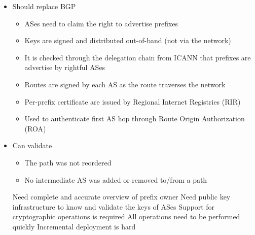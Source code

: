 \begin{itemize}
\begin{itemize}
\begin{itemize}
                    \item Should replace BGP
                        \begin{itemize}
                            \item ASes need to claim the right to advertise prefixes
                            \item Keys are signed and distributed out-of-band (not via the network)
                            \item It is checked through the delegation chain from ICANN that prefixes are advertise by rightful ASes
                        \end{itemize}
                        \begin{itemize}
                            \item Routes are signed by each AS as the route traverses the network
                        \end{itemize}
                        \begin{itemize}
                            \item Per-prefix certificate are issued by Regional Internet Registries (RIR)
                            \item Used to authenticate first AS hop through Route Origin Authorization (ROA)
                        \end{itemize}
                    \item Can validate
                        \begin{itemize}
                            \item The path was not reordered
                            \item No intermediate AS was added or removed to/from a path
                        \end{itemize}
                        \begin{itemize}
                            \icon Need complete and accurate overview of prefix owner
                            \icon Need public key infrastructure to know and validate the keys of ASes
                            \icon Support for cryptographic operations is required
                            \icon All operations need to be performed quickly
                            \icon Incremental deployment is hard
                                \begin{itemize}

\end{itemize}
\end{itemize}
\end{itemize}
\end{itemize}
\end{itemize}
